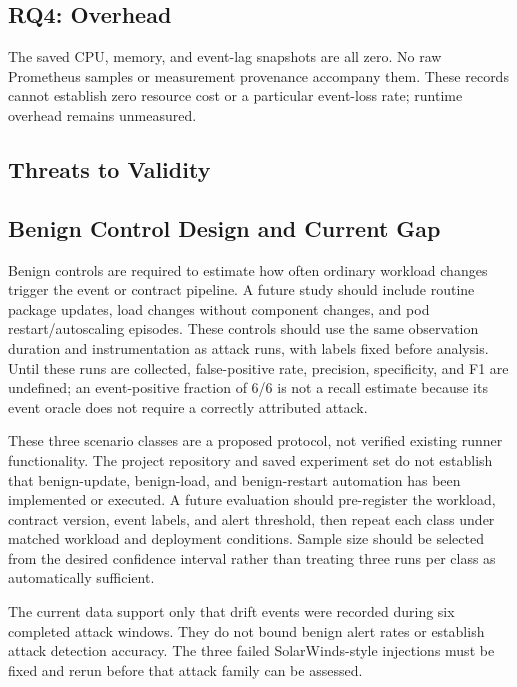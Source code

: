 \documentclass[conference]{IEEEtran}
\begin{document}
\subsection{RQ4: Overhead}
The saved CPU, memory, and event-lag snapshots are all zero. No raw Prometheus samples or measurement provenance accompany them. These records cannot establish zero resource cost or a particular event-loss rate; runtime overhead remains unmeasured.

\subsection{Threats to Validity}
\subsection{Benign Control Design and Current Gap}
Benign controls are required to estimate how often ordinary workload changes trigger the event or contract pipeline. A future study should include routine package updates, load changes without component changes, and pod restart/autoscaling episodes. These controls should use the same observation duration and instrumentation as attack runs, with labels fixed before analysis. Until these runs are collected, false-positive rate, precision, specificity, and F1 are undefined; an event-positive fraction of 6/6 is not a recall estimate because its event oracle does not require a correctly attributed attack.

These three scenario classes are a proposed protocol, not verified existing runner functionality. The project repository and saved experiment set do not establish that benign-update, benign-load, and benign-restart automation has been implemented or executed. A future evaluation should pre-register the workload, contract version, event labels, and alert threshold, then repeat each class under matched workload and deployment conditions. Sample size should be selected from the desired confidence interval rather than treating three runs per class as automatically sufficient.

The current data support only that drift events were recorded during six completed attack windows. They do not bound benign alert rates or establish attack detection accuracy. The three failed SolarWinds-style injections must be fixed and rerun before that attack family can be assessed.
\end{document}
